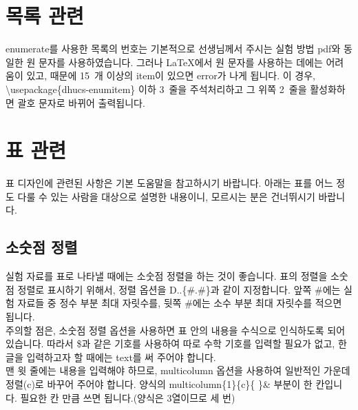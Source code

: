 \documentclass[a4paper,10pt]{article}
\begin{document}
	\section{목록 관련}
	enumerate를 사용한 목록의 번호는 기본적으로 선생님께서 주시는
	실험 방법 pdf와 동일한 원 문자를 사용하였습니다.
	그러나 \LaTeX 에서 원 문자를 사용하는 데에는 어려움이 있고, 때문에
	15~개 이상의 item이 있으면 error가 나게 됩니다. 이 경우,
	\textbackslash usepackage\{dhucs-enumitem\} 이하 3~줄을
	주석처리하고 그 위쪽 2~줄을 활성화하면 괄호 문자로 바뀌어 출력됩니다.
	
	\section{표 관련}
	
	표 디자인에 관련된 사항은 기본 도움말을 참고하시기 바랍니다.
	아래는 표를 어느 정도 다룰 수 있는 사람을 대상으로
	설명한 내용이니, 모르시는 분은 건너뛰시기 바랍니다.
	
	\subsection{소숫점 정렬}
	실험 자료를 표로 나타낼 때에는 소숫점 정렬을 하는 것이 좋습니다.
	표의 정렬을 소숫점 정렬로 표시하기 위해서, 정렬 옵션을
	D..\{\#.\#\}과 같이 지정합니다.
	앞쪽 \#에는 실험 자료들 중 정수 부분 최대 자릿수를,
	뒷쪽 \#에는 소수 부분 최대 자릿수를 적으면 됩니다.\\
	주의할 점은, 소숫점 정렬 옵션을 사용하면 표 안의 내용을
	수식으로 인식하도록 되어 있습니다. 따라서 \$과 같은 기호를 사용하여
	따로 수학 기호를 입력할 필요가 없고, 한글을 입력하고자 할 때에는 
	text를 써 주어야 합니다.\\
	맨 윗 줄에는 내용을 입력해야 하므로, multicolumn 옵션을 사용하여
	일반적인 가운데 정렬(c)로 바꾸어 주어야 합니다.
	양식의 multicolumn\{1\}\{c\}\{ \}\& 부분이 한 칸입니다.
	필요한 칸 만큼 쓰면 됩니다.(양식은 3열이므로 세 번)
	
\end{document}
